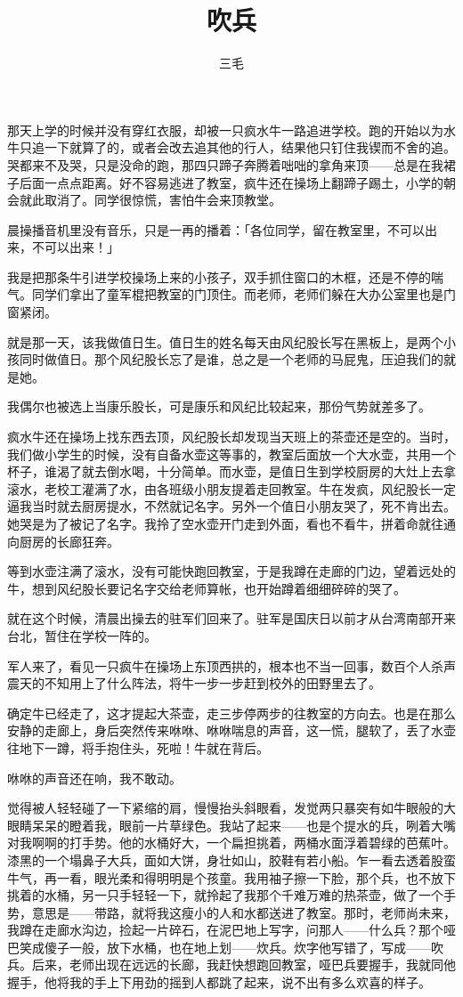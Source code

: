 \documentclass[UTF8]{ctexart}
\title{吹兵}
\author{三毛}
\date{}
\begin{document}
\maketitle

\newpage

那天上学的时候并没有穿红衣服，却被一只疯水牛一路追进学校。跑的开始以为水牛只追一下就算了的，或者会改去追其他的行人，结果他只钉住我锲而不舍的追。哭都来不及哭，只是没命的跑，那四只蹄子奔腾着咄咄的拿角来顶——总是在我裙子后面一点点距离。好不容易逃进了教室，疯牛还在操场上翻蹄子踢土，小学的朝会就此取消了。同学很惊慌，害怕牛会来顶教堂。

晨操播音机里没有音乐，只是一再的播着：「各位同学，留在教室里，不可以出来，不可以出来！」

我是把那条牛引进学校操场上来的小孩子，双手抓住窗口的木框，还是不停的喘气。同学们拿出了童军棍把教室的门顶住。而老师，老师们躲在大办公室里也是门窗紧闭。

就是那一天，该我做值日生。值日生的姓名每天由风纪股长写在黑板上，是两个小孩同时做值日。那个风纪股长忘了是谁，总之是一个老师的马屁鬼，压迫我们的就是她。

我偶尔也被选上当康乐股长，可是康乐和风纪比较起来，那份气势就差多了。

疯水牛还在操场上找东西去顶，风纪股长却发现当天班上的茶壶还是空的。当时，我们做小学生的时候，没有自备水壶这等事的，教室后面放一个大水壶，共用一个杯子，谁渴了就去倒水喝，十分简单。而水壶，是值日生到学校厨房的大灶上去拿滚水，老校工灌满了水，由各班级小朋友提着走回教室。牛在发疯，风纪股长一定逼我当时就去厨房提水，不然就记名字。另外一个值日小朋友哭了，死不肯出去。她哭是为了被记了名字。我拎了空水壶开门走到外面，看也不看牛，拼着命就往通向厨房的长廊狂奔。

等到水壶注满了滚水，没有可能快跑回教室，于是我蹲在走廊的门边，望着远处的牛，想到风纪股长要记名字交给老师算帐，也开始蹲着细细碎碎的哭了。

就在这个时候，清晨出操去的驻军们回来了。驻军是国庆日以前才从台湾南部开来台北，暂住在学校一阵的。

军人来了，看见一只疯牛在操场上东顶西拱的，根本也不当一回事，数百个人杀声震天的不知用上了什么阵法，将牛一步一步赶到校外的田野里去了。

确定牛已经走了，这才提起大茶壶，走三步停两步的往教室的方向去。也是在那么安静的走廊上，身后突然传来咻咻、咻咻喘息的声音，这一慌，腿软了，丢了水壶往地下一蹲，将手抱住头，死啦！牛就在背后。

咻咻的声音还在响，我不敢动。

觉得被人轻轻碰了一下紧缩的肩，慢慢抬头斜眼看，发觉两只暴突有如牛眼般的大眼睛呆呆的瞪着我，眼前一片草绿色。我站了起来——也是个提水的兵，咧着大嘴对我啊啊的打手势。他的水桶好大，一个扁担挑着，两桶水面浮着碧绿的芭蕉叶。漆黑的一个塌鼻子大兵，面如大饼，身壮如山，胶鞋有若小船。乍一看去透着股蛮牛气，再一看，眼光柔和得明明是个孩童。我用袖子擦一下脸，那个兵，也不放下挑着的水桶，另一只手轻轻一下，就拎起了我那个千难万难的热茶壶，做了一个手势，意思是——带路，就将我这瘦小的人和水都送进了教室。那时，老师尚未来，我蹲在走廊水沟边，捡起一片碎石，在泥巴地上写字，问那人——什么兵？那个哑巴笑成傻子一般，放下水桶，也在地上划——炊兵。炊字他写错了，写成——吹兵。后来，老师出现在远远的长廊，我赶快想跑回教室，哑巴兵要握手，我就同他握手，他将我的手上下用劲的摇到人都跳了起来，说不出有多么欢喜的样子。
\end{document}
